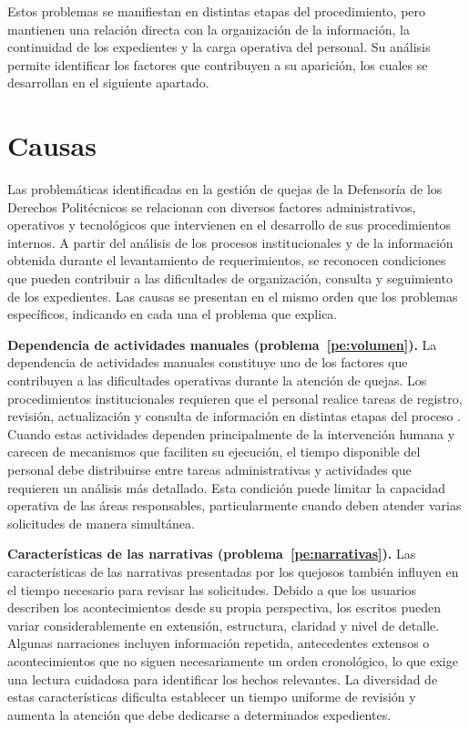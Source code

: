 	Estos problemas se manifiestan en distintas etapas del procedimiento, pero mantienen una relación directa con la organización de la información, la continuidad de los expedientes y la carga operativa del personal. Su análisis permite identificar los factores que contribuyen a su aparición, los cuales se desarrollan en el siguiente apartado.

	\section{Causas}
	\label{sec:causas}
	Las problemáticas identificadas en la gestión de quejas de la Defensoría de los Derechos Politécnicos se relacionan con diversos factores administrativos, operativos y tecnológicos que intervienen en el desarrollo de sus procedimientos internos. A partir del análisis de los procesos institucionales y de la información obtenida durante el levantamiento de requerimientos, se reconocen condiciones que pueden contribuir a las dificultades de organización, consulta y seguimiento de los expedientes. Las causas se presentan en el mismo orden que los problemas específicos, indicando en cada una el problema que explica.

	\textbf{Dependencia de actividades manuales (problema~\ref{pe:volumen}).} La dependencia de actividades manuales constituye uno de los factores que contribuyen a las dificultades operativas durante la atención de quejas. Los procedimientos institucionales requieren que el personal realice tareas de registro, revisión, actualización y consulta de información en distintas etapas del proceso \cite{ipn_manual_procedimientos_ddp}. Cuando estas actividades dependen principalmente de la intervención humana y carecen de mecanismos que faciliten su ejecución, el tiempo disponible del personal debe distribuirse entre tareas administrativas y actividades que requieren un análisis más detallado. Esta condición puede limitar la capacidad operativa de las áreas responsables, particularmente cuando deben atender varias solicitudes de manera simultánea.

	\textbf{Características de las narrativas (problema~\ref{pe:narrativas}).} Las características de las narrativas presentadas por los quejosos también influyen en el tiempo necesario para revisar las solicitudes. Debido a que los usuarios describen los acontecimientos desde su propia perspectiva, los escritos pueden variar considerablemente en extensión, estructura, claridad y nivel de detalle. Algunas narraciones incluyen información repetida, antecedentes extensos o acontecimientos que no siguen necesariamente un orden cronológico, lo que exige una lectura cuidadosa para identificar los hechos relevantes. La diversidad de estas características dificulta establecer un tiempo uniforme de revisión y aumenta la atención que debe dedicarse a determinados expedientes.

